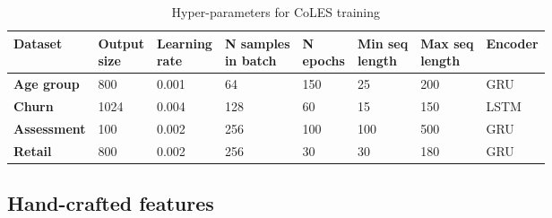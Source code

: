 \documentclass{article}
\begin{document}
\begin{table}
\centering
\caption{Hyper-parameters for CoLES training}
\begin{tabular}{llllllll}
\toprule
\textbf{Dataset} & \makecell[l]{\textbf{Output} \\ \textbf{size}} & \makecell[l]{\textbf{Learning} \\ \textbf{rate}} & \makecell[l]{\textbf{N samples} \\ \textbf{in batch}} & \makecell[l]{\textbf{N} \\ \textbf{epochs}} & \makecell[l]{\textbf{Min seq} \\ \textbf{length}} & \makecell[l]{\textbf{Max seq} \\ \textbf{length}} & \textbf{Encoder} \\
\midrule
\textbf{Age group} & 800 & 0.001 & 64 & 150 & 25 & 200 & GRU \\
\textbf{Churn} & 1024 & 0.004 & 128 & 60 & 15 & 150 & LSTM \\
\textbf{Assessment} & 100 & 0.002 & 256 & 100 & 100 & 500 & GRU \\
\textbf{Retail} & 800 & 0.002 & 256 & 30 & 30 & 180& GRU \\
\bottomrule
\end{tabular}
\label{tab-hyper}
\end{table}

\subsection{Hand-crafted features} \label{app-sec-hand}
\end{document}
